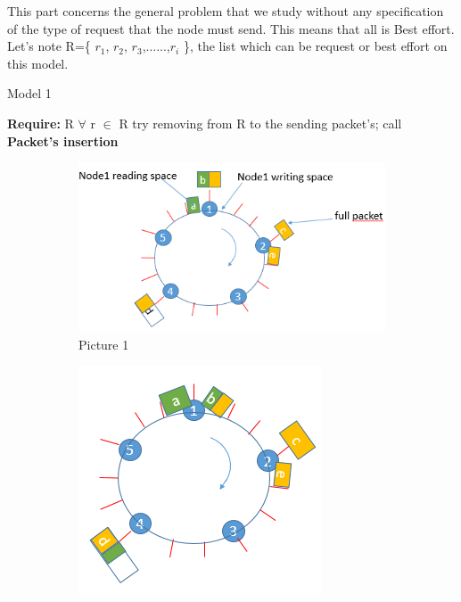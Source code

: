 \documentclass{article}
\begin{document}
This part concerns the general problem that we study without any specification of the type of request that the node must send. This means that all is Best effort.\\
Let's note R=\{ $r_{1}$, $r_{2}$, $r_{3}$,......,$r_{i}$  \}, the list which can be request or best effort on this model.\\
\begin{algorithm}
\caption{Model 1}
\begin{algorithmic}
\State \textbf{Require:} R
\State $\forall$ r $\in$ R try removing from R to the sending packet's;
\State call \textbf{ Packet's insertion}
\end{algorithmic}
\end{algorithm}

\begin{figure}[h!]
  \begin{subfigure}[b]{0.9\textwidth}
    \includegraphics[width=\textwidth]{etape1.PNG}
    \caption{Picture 1}
    \label{fig:1}
  \end{subfigure}
  \begin{subfigure}[b]{0.5\textwidth}
    \includegraphics[width=\textwidth]{etape2.PNG}

\end{subfigure}
\end{figure}
\end{document}

